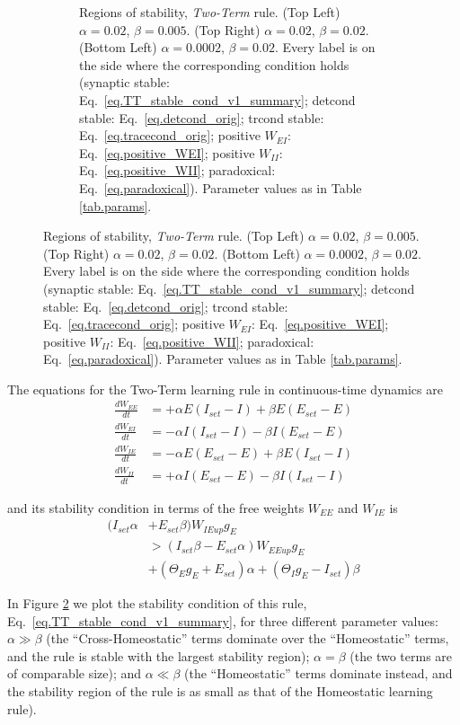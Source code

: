 \documentclass[twocolumn]{article}
\newcommand{\EE}{\mathit{EE}}
\newcommand{\EI}{\mathit{EI}}
\newcommand{\IE}{\mathit{IE}}
\newcommand{\II}{\mathit{II}}
\newcommand{\set}{\mathit{set}}
\newcommand{\up}{\mathit{up}}
\begin{document}
\begin{figure}[!ht]
{\begin{figure}[H]
\caption{Regions of stability, {\em Two-Term} rule. (Top Left) $\alpha=0.02$, $\beta=0.005$. (Top Right) $\alpha=0.02$, $\beta=0.02$. (Bottom Left) $\alpha=0.0002$, $\beta=0.02$. Every label is on the side where the  corresponding  condition  holds (synaptic stable: Eq.\ \ref{eq.TT_stable_cond_v1_summary}; detcond stable: Eq.\ \ref{eq.detcond_orig}; trcond stable: Eq.\ \ref{eq.tracecond_orig}; positive $W_{\EI}$: Eq.\ \ref{eq.positive_WEI}; positive $W_{\II}$: Eq.\ \ref{eq.positive_WII}; paradoxical: Eq.\ \ref{eq.paradoxical}). Parameter values as in Table \ref{tab.params}.}
\label{fig.TT_stability}
\end{figure}}
\end{figure}



The equations for the Two-Term learning rule in continuous-time dynamics are
\begin{equation}
\begin{aligned}
\frac{dW_{\EE}}{dt} & = +\alpha E (I_{\set} - I) + \beta E (E_{\set} - E) \\
\frac{dW_{\EI}}{dt} & = -\alpha I (I_{\set} - I) - \beta I (E_{\set} - E) \\
\frac{dW_{\IE}}{dt} & = -\alpha E (E_{\set} - E) + \beta E (I_{\set} - I) \\
\frac{dW_{\II}}{dt} & = +\alpha I (E_{\set} - E) - \beta I (I_{\set} - I)
\end{aligned}
\label{eq.TT_summary}
\end{equation}

\noindent and its stability condition in terms of the free weights $W_{\EE}$ and $W_{\IE}$ is
\begin{equation}
\begin{aligned}
(I_{\set} \alpha & + E_{\set} \beta) W_{\IE\up} g_E \\
& > (I_{\set} \beta - E_{\set} \alpha) W_{\EE\up} g_E \\
& + (\Theta_E g_E + E_{\set}) \alpha + (\Theta_I g_E - I_{\set}) \beta
\end{aligned}
\label{eq.TT_stable_cond_v1_summary}
\end{equation}

In Figure \ref{fig.TT_stability} we plot the stability condition of this rule, Eq.\ \ref{eq.TT_stable_cond_v1_summary}, for three different parameter values: $\alpha \gg \beta$ (the ``Cross-Homeostatic'' terms dominate over the ``Homeostatic'' terms, and the rule is stable with the largest stability region); $\alpha = \beta$ (the two terms are of comparable size); and $\alpha \ll \beta$ (the ``Homeostatic'' terms dominate instead, and the stability region of the rule is as small as that of the Homeostatic learning rule).
\end{document}
